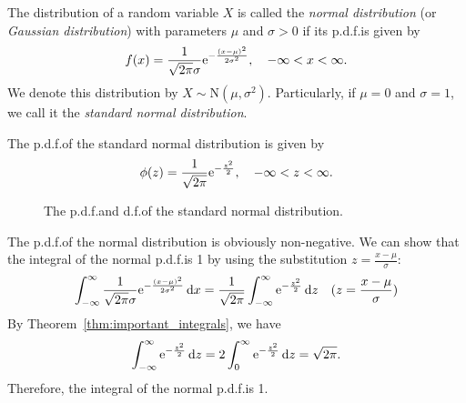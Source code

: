 \begin{definition}
  The distribution of a random variable \(X\) is called the \emph{normal distribution} (or \emph{Gaussian distribution}) with parameters \(\mu\) and \(\sigma > 0\) if its p.d.f.\@ is given by
  \[
    f(x) = \frac{1}{\sqrt{2\mathrm{\pi}} \sigma} \mathrm{e}^{-\frac{(x - \mu)^2}{2\sigma^2}}, \quad -\infty < x < \infty.
  \]
  We denote this distribution by \(X \sim \mathrm{N}(\mu, \sigma^2)\). Particularly, if \(\mu = 0\) and \(\sigma = 1\), we call it the \emph{standard normal distribution}.
\end{definition}

The p.d.f.\@ of the standard normal distribution is given by
\[
  \phi(z) = \frac{1}{\sqrt{2\mathrm{\pi}}} \mathrm{e}^{-\frac{z^2}{2}}, \quad -\infty < z < \infty.
\]

\begin{figure}[tbp]
  \centering
  \caption{The p.d.f.\@ and d.f.\@ of the standard normal distribution.}
\end{figure}

The p.d.f.\@ of the normal distribution is obviously non-negative. We can show that the integral of the normal p.d.f.\@ is 1 by using the substitution \(z = \frac{x - \mu}{\sigma}\):
\[
  \int_{-\infty}^\infty \frac{1}{\sqrt{2\mathrm{\pi}} \sigma} \mathrm{e}^{-\frac{(x - \mu)^2}{2\sigma^2}}\,\mathrm{d} x = \frac{1}{\sqrt{2\mathrm{\pi}}} \int_{-\infty}^\infty \mathrm{e}^{-\frac{z^2}{2}}\,\mathrm{d} z \quad (z = \frac{x - \mu}{\sigma})
\]
By Theorem~\ref{thm:important_integrals}, we have
\[
  \int_{-\infty}^\infty \mathrm{e}^{-\frac{z^2}{2}}\,\mathrm{d} z = 2 \int_{0}^{\infty} \mathrm{e}^{-\frac{z^2}{2}}\,\mathrm{d} z = \sqrt{2\mathrm{\pi}}.
\]
Therefore, the integral of the normal p.d.f.\@ is 1.

